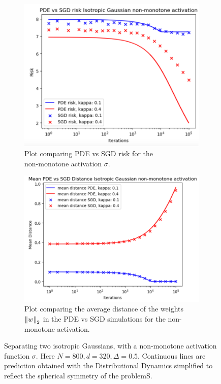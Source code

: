 \documentclass{article}
\begin{document}
    \begin{figure}[H]
\begin{subfigure}{0.5\textwidth}
  \centering
  \includegraphics[width=0.8\linewidth]{images/NGuyen2018-pde-sgd-risk-iso-gauss-non-mon.png}
  \caption{Plot comparing PDE vs SGD risk for the\\  non-monotone activation $ \sigma$.}
  \label{fig: pde vs sgd non-monotone}
\end{subfigure}%
\begin{subfigure}{0.5\textwidth}
  \centering
  \includegraphics[width=0.8\linewidth]{images/NGuyen2018-pde-sgd-iso-gauss-non-mon.png}
  \caption{ Plot comparing the average distance of the weights $ \left\lVert w\right\rVert_{2}$ in the PDE vs SGD simulations for the non-monotone activation.}
  \label{fig: avg distance pde sgd non-monotone}
\end{subfigure}
\caption{ Separating two isotropic Gaussians, with a non-monotone activation function $ \sigma$. Here $N = 800, d = 320, \Delta = 0.5$. Continuous lines are prediction
obtained with the Distributional Dynamics simplified to reflect the spherical symmetry of the problemS.
}
\label{fig:  non-monotone simulation sgd vs pde}
\end{figure}
\end{document}
